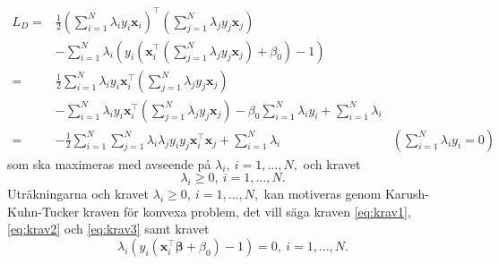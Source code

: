 \documentclass[a4paper, 12pt]{report}
\theoremstyle{definition}
\theoremstyle{remark}
\newcommand{\bfbeta}{{\boldsymbol{\beta}}}
\begin{document}
\begin{equation*}
\begin{aligned}
	L_D=&\frac{1}{2}\left(\sum_{i=1}^{N}\lambda_i y_i \mathbf{x}_i\right)^\intercal \left(\sum_{j=1}^{N}\lambda_j y_j \mathbf{x}_j\right)&\\
	&- \sum_{i=1}^{N}\lambda_i \left(y_i\left(\mathbf{x}_i^\intercal \left(\sum_{j=1}^{N} \lambda_j y_j \mathbf{x}_j\right) +\beta_0 \right) -1\right)&\\
	=& \frac{1}{2} \sum_{i=1}^{N} \lambda_i y_i \mathbf{x}_i^\intercal\left(\sum_{j=1}^{N} \lambda_j y_j \mathbf{x}_j\right) &\\
	&- \sum_{i=1}^{N}\lambda_i y_i \mathbf{x}_i^\intercal \left(\sum_{j=1}^{N} \lambda_j y_j \mathbf{x}_j\right) - \beta_0 \sum_{i=1}^{N} \lambda_i y_i  + \sum_{i=1}^{N} \lambda_i&\\
	=& -\frac{1}{2} \sum_{i=1}^{N} \sum_{j=1}^{N} \lambda_i \lambda_j y_i y_j \mathbf{x}_i^\intercal \mathbf{x}_j + \sum_{i=1}^{N} \lambda_i &\textstyle{\left(\sum\limits_{i=1}^{N}\lambda_iy_i = 0\right)}
\end{aligned}
\end{equation*}
som ska maximeras med avseende på $\lambda_i,~i=1,\dots,N,$ och kravet \begin{equation}\label{eq:krav3}
	\lambda_i\geq 0,~i=1,\dots,N.
\end{equation} Uträkningarna och kravet $\lambda_i\geq 0,~i=1,\dots,N,$ kan motiveras genom Karush-Kuhn-Tucker kraven för konvexa problem, det vill säga kraven \ref{eq:krav1}, \ref{eq:krav2} och \ref{eq:krav3} samt kravet
\begin{equation}\label{eq:krav4}
	\lambda_i\left( y_i\left( \mathbf{x}_i^\intercal \bfbeta + \beta_0 \right) -1 \right) = 0,~i=1,\dots, N.
\end{equation}
\end{document}
